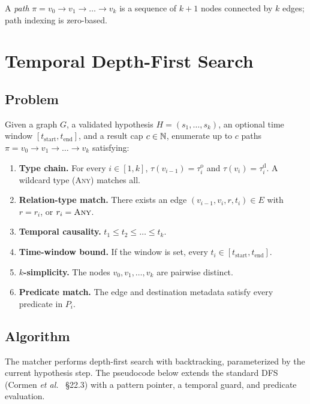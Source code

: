 \documentclass[11pt,openany]{book}
\begin{document}
A \emph{path} $\pi = v_0 \to v_1 \to \dots \to v_k$ is a sequence
of $k+1$ nodes connected by $k$ edges; path indexing is zero-based.

\chapter{Temporal Depth-First Search}
\label{chap:dfs}

\section{Problem}
\label{sec:dfs:problem}

\begin{problem}
\label{prob:dfs}
Given a graph $G$, a validated hypothesis $H = (s_1, \dots, s_k)$,
an optional time window $[t_{\text{start}}, t_{\text{end}}]$, and a
result cap $c \in \mathbb{N}$, enumerate up to $c$ paths
$\pi = v_0 \to v_1 \to \dots \to v_k$ satisfying:
\begin{enumerate}
  \item \textbf{Type chain.} For every $i \in [1, k]$,
        $\tau(v_{i-1}) = \tau^{\mathrm{o}}_i$ and
        $\tau(v_i) = \tau^{\mathrm{d}}_i$. A wildcard type
        (\textsc{Any}) matches all.
  \item \textbf{Relation-type match.} There exists an edge
        $(v_{i-1}, v_i, r, t_i) \in E$ with $r = r_i$, or
        $r_i = \textsc{Any}$.
  \item \textbf{Temporal causality.} $t_1 \le t_2 \le \dots \le t_k$.
  \item \textbf{Time-window bound.} If the window is set, every
        $t_i \in [t_{\text{start}}, t_{\text{end}}]$.
  \item \textbf{$k$-simplicity.} The nodes $v_0, v_1, \dots, v_k$
        are pairwise distinct.
  \item \textbf{Predicate match.} The edge and destination metadata
        satisfy every predicate in $P_i$.
\end{enumerate}
\end{problem}

\section{Algorithm}
\label{sec:dfs:algorithm}

The matcher performs depth-first search with backtracking,
parameterized by the current hypothesis step. The pseudocode below
extends the standard DFS (Cormen \emph{et al.}~\cite{clrs} \S22.3)
with a pattern pointer, a temporal guard, and predicate evaluation.
\end{document}
